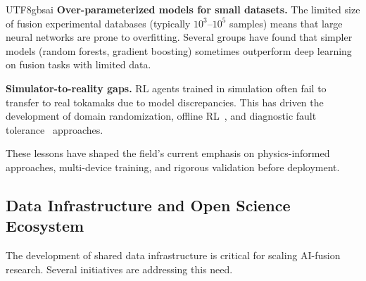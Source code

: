 \documentclass[12pt,a4paper]{article}
\begin{document}
\begin{CJK}{UTF8}{gbsai}
\textbf{Over-parameterized models for small datasets.} The limited size of fusion experimental databases (typically $10^3$--$10^5$ samples) means that large neural networks are prone to overfitting. Several groups have found that simpler models (random forests, gradient boosting) sometimes outperform deep learning on fusion tasks with limited data.

\textbf{Simulator-to-reality gaps.} RL agents trained in simulation often fail to transfer to real tokamaks due to model discrepancies. This has driven the development of domain randomization, offline RL~\citep{Sonker2026}, and diagnostic fault tolerance~\citep{Sorokin2026} approaches.

These lessons have shaped the field's current emphasis on physics-informed approaches, multi-device training, and rigorous validation before deployment.

\subsection{Data Infrastructure and Open Science Ecosystem}

The development of shared data infrastructure is critical for scaling AI-fusion research. Several initiatives are addressing this need.


\end{CJK}
\end{document}
